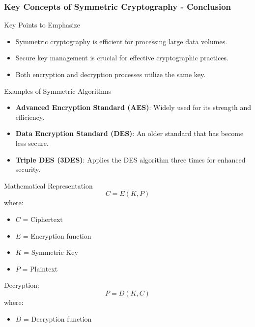 \documentclass{beamer}
\begin{document}
\begin{frame}[fragile]
    \frametitle{Key Concepts of Symmetric Cryptography - Conclusion}
    \begin{block}{Key Points to Emphasize}
        \begin{itemize}
            \item Symmetric cryptography is efficient for processing large data volumes.
            \item Secure key management is crucial for effective cryptographic practices.
            \item Both encryption and decryption processes utilize the same key.
        \end{itemize}
    \end{block}

    \begin{block}{Examples of Symmetric Algorithms}
        \begin{itemize}
            \item \textbf{Advanced Encryption Standard (AES)}: Widely used for its strength and efficiency.
            \item \textbf{Data Encryption Standard (DES)}: An older standard that has become less secure.
            \item \textbf{Triple DES (3DES)}: Applies the DES algorithm three times for enhanced security.
        \end{itemize}
    \end{block}

    \begin{block}{Mathematical Representation}
        \begin{equation}
            C = E(K, P)
        \end{equation}
        where:
        \begin{itemize}
            \item \( C \) = Ciphertext
            \item \( E \) = Encryption function
            \item \( K \) = Symmetric Key
            \item \( P \) = Plaintext
        \end{itemize}
        
        Decryption:
        \begin{equation}
            P = D(K, C)
        \end{equation}
        where:
        \begin{itemize}
            \item \( D \) = Decryption function
        \end{itemize}
    \end{block}
\end{frame}
\end{document}
